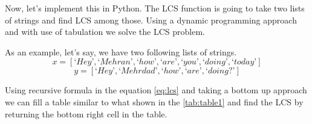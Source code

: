 Now, let’s implement this in Python. The LCS function is going to 
take two lists of strings and find LCS among those. Using a dynamic 
programming approach and with use of tabulation we solve the LCS 
problem.

As an example, let’s  say, we have two following lists of strings. 
$$x = [‘Hey’, ‘Mehran’, ‘how’, ‘are’, ‘you’, ‘doing’, ‘today’] $$
$$ y = [‘Hey’, ‘Mehrdad’, ‘how’, ‘are’, ‘doing?’] $$

Using recursive formula in the equation \ref{eq:lcs} and taking a 
bottom up approach we can fill a table similar to what shown in the 
\ref{tab:table1} and find the LCS by returning the bottom right cell
in the table.
\begin{table}[H]
  \begin{center}
    \caption{LCS of two lists. Blue colored list is the answer.}
    \label{tab:table1}
  \end{center}
\end{table}

